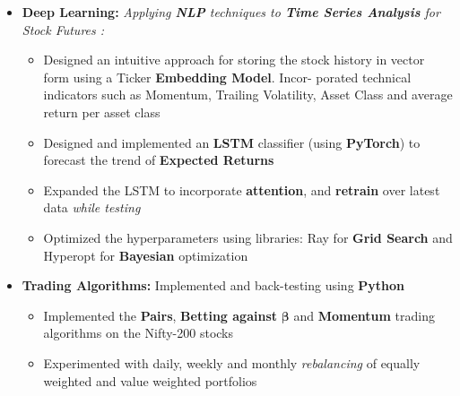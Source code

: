 \documentclass{article}
\begin{document}
\begin{itemize}[itemsep = -1 mm, leftmargin=*]
    \item \textbf{Deep Learning: }{\it Applying \textbf{NLP} techniques to \textbf{Time Series Analysis} for Stock Futures :}
    \vspace{-6pt}
    \begin{itemize}[itemsep = -0.6 mm, leftmargin=*]
      \item Designed an intuitive approach for storing the stock history in vector form using a Ticker \textbf{Embedding Model}. Incor-\vspace{-0.3mm} porated technical indicators such as Momentum, Trailing Volatility, Asset Class and average return per asset class
     \item Designed and implemented an \textbf{LSTM} classifier (using \textbf{PyTorch}) to forecast the trend of \textbf{Expected Returns} %
     \item Expanded the LSTM to incorporate \textbf{attention}, and \textbf{retrain} over latest data \textit{while testing}
     \item Optimized the hyperparameters using libraries: Ray for \textbf{Grid Search} and Hyperopt for \textbf{Bayesian} optimization
    \end{itemize}
    \vspace{-3.5pt}
    \item \textbf{Trading Algorithms:} Implemented and back-testing using \textbf{Python}
    \vspace{-7pt}
    \begin{itemize}[itemsep = -0.6 mm, leftmargin=*]
      \item  Implemented the \textbf{Pairs}, \textbf{Betting against} $\bm{\beta}$ and \textbf{Momentum} trading algorithms on the Nifty-200 stocks
      \item Experimented with daily, weekly\vspace{-0.3mm} and monthly \textit{rebalancing} of equally weighted and value weighted portfolios

\end{itemize}
\end{itemize}
\end{document}
